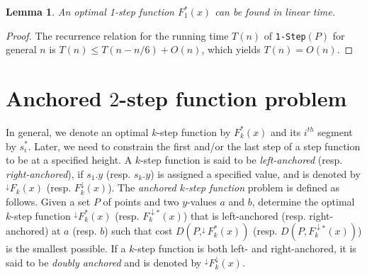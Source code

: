 \documentclass[preprint,10pt]{elsarticle}
\newtheorem{lemma}{Lemma}
\begin{document}
\begin{lemma}\label{lem:1step}
An optimal 1-step function $F^*_1(x)$ can be found in linear time.
\end{lemma}
\begin{proof}
The recurrence relation for the running time $T(n)$ of {\tt 1-Step}$(P)$ for general $n$ is 
$T(n) \leq T(n-n/6) + O(n)$,
which yields $T(n) = O(n)$.
\end{proof}

\section{Anchored $2$-step function problem}\label{sec:cond2step}
In general, we denote an optimal $k$-step function by $F^*_k(x)$
and its $i^{th}$ segment by $s^*_i$. 
Later, we need to constrain the first and/or the last step of a step function to be
at a specified height.
A $k$-step function is said to be {\em left-anchored} (resp. {\em right-anchored}),
if $s_1.y$ (resp.  $s_k.y$) is assigned a specified value,
and is denoted by $^{\downarrow}\!F_k(x)$ (resp. $F_k^{\downarrow}(x)$).
The {\em anchored $k$-step function} problem is defined as follows.
Given a set $P$ of points and two $y$-values $a$ and $b$,
determine the optimal $k$-step function $^{\downarrow}\!F^*_k(x)$  (resp. $F_k^{\downarrow *}(x)$)
that is left-anchored (resp. right-anchored) at 
$a$ (resp. $b$) such that cost $D(P, ^{\downarrow}\!\!F^*_k(x))$ (resp. $D(P, F_k^{\downarrow *}(x))$)
 is the smallest possible.
If a $k$-step function is both left- and right-anchored, 
it is said to be {\em doubly anchored} and is
denoted by $^{\downarrow}\!F_k^{\downarrow}(x)$.
\end{document}
